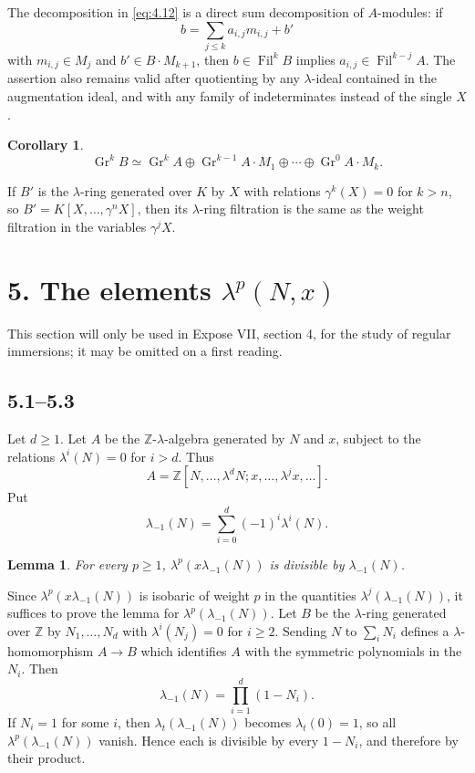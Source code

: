 \documentclass[13pt]{extarticle}
\newcommand{\ZZ}{\mathbb Z}
\newcommand{\Fil}{\operatorname{Fil}}
\newcommand{\Gr}{\operatorname{Gr}}
\newtheorem*{corollary}{Corollary}
\newtheorem*{lemma}{Lemma}
\begin{document}
The decomposition in \eqref{eq:4.12} is a direct sum decomposition of $A$-modules: if
\[
b=\sum_{j\leq k}a_{i,j}m_{i,j}+b'
\]
with $m_{i,j}\in M_j$ and $b'\in B\cdot M_{k+1}$, then $b\in\Fil^kB$ implies $a_{i,j}\in\Fil^{k-j}A$. The assertion also remains valid after quotienting by any $\lambda$-ideal contained in the augmentation ideal, and with any family of indeterminates instead of the single $X$.

\begin{corollary}
\[
\Gr^kB\simeq \Gr^kA\oplus \Gr^{k-1}A\cdot M_1\oplus\cdots\oplus\Gr^0A\cdot M_k.
\]
\end{corollary}

If $B'$ is the $\lambda$-ring generated over $K$ by $X$ with relations $\gamma^k(X)=0$ for $k>n$, so $B'=K[X,\ldots,\gamma^nX]$, then its $\lambda$-ring filtration is the same as the weight filtration in the variables $\gamma^jX$.

\section*{5. The elements $\lambda^p(N,x)$}

This section will only be used in Expose VII, section 4, for the study of regular immersions; it may be omitted on a first reading.

\subsection*{5.1--5.3}
Let $d\geq 1$. Let $A$ be the $\ZZ$-$\lambda$-algebra generated by $N$ and $x$, subject to the relations $\lambda^i(N)=0$ for $i>d$. Thus
\[
A=\ZZ[N,\ldots,\lambda^dN;x,\ldots,\lambda^jx,\ldots].
\]
Put
\[
\lambda_{-1}(N)=\sum_{i=0}^{d}(-1)^i\lambda^i(N).
\]

\begin{lemma}
For every $p\geq 1$, $\lambda^p(x\lambda_{-1}(N))$ is divisible by $\lambda_{-1}(N)$.
\end{lemma}

Since $\lambda^p(x\lambda_{-1}(N))$ is isobaric of weight $p$ in the quantities $\lambda^j(\lambda_{-1}(N))$, it suffices to prove the lemma for $\lambda^p(\lambda_{-1}(N))$. Let $B$ be the $\lambda$-ring generated over $\ZZ$ by $N_1,\ldots,N_d$ with $\lambda^i(N_j)=0$ for $i\geq 2$. Sending $N$ to $\sum_iN_i$ defines a $\lambda$-homomorphism $A\to B$ which identifies $A$ with the symmetric polynomials in the $N_i$. Then
\[
\lambda_{-1}(N)=\prod_{i=1}^{d}(1-N_i).
\]
If $N_i=1$ for some $i$, then $\lambda_t(\lambda_{-1}(N))$ becomes $\lambda_t(0)=1$, so all $\lambda^p(\lambda_{-1}(N))$ vanish. Hence each is divisible by every $1-N_i$, and therefore by their product.
\end{document}
